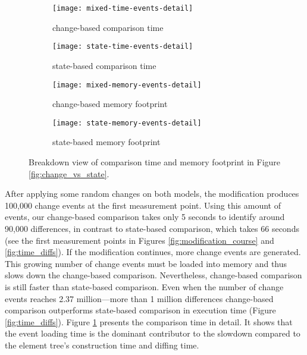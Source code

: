 \begin{figure}[ht]
  \centering
  \begin{subfigure}[t]{0.495\linewidth}
    \texttt{[image: mixed-time-events-detail]}
    \caption{change-based comparison time}
    \label{fig:time_changediff_detail}
  \end{subfigure}
  \hfill
  \begin{subfigure}[t]{0.495\linewidth}
    \texttt{[image: state-time-events-detail]}
    \caption{state-based comparison time}
    \label{fig:time_statediff_detail}
  \end{subfigure}
  \begin{subfigure}[t]{0.495\linewidth}
    \texttt{[image: mixed-memory-events-detail]}
    \caption{change-based memory footprint}
    \label{fig:memory_changediff_detail}
  \end{subfigure}
  \hfill
  \begin{subfigure}[t]{0.495\linewidth}
    \texttt{[image: state-memory-events-detail]}
    \caption{state-based memory footprint}
    \label{fig:memory_statediff_detail}
  \end{subfigure}
  \caption{Breakdown view of comparison time and memory footprint in Figure \ref{fig:change_vs_state}.}
  \label{fig:time_memory_detail}
\end{figure}

After applying some random changes on both models, the modification produces 100,000 change events at the first measurement point. Using this amount of events, our change-based comparison takes only 5 seconds to identify around 90,000 differences, in contrast to state-based comparison, which takes 66 seconds (see the first measurement points in Figures \ref{fig:modification_course} and \ref{fig:time_diffs}). If the modification continues, more change events are generated. This growing number of change events must be loaded into memory and thus slows down the change-based comparison. Nevertheless, change-based comparison is still faster than state-based comparison. Even when the number of change events reaches 2.37 million—more than 1 million differences  change-based comparison outperforms state-based comparison in execution time (Figure \ref{fig:time_diffs}). Figure \ref{fig:time_changediff_detail} presents the comparison time in detail. It shows that the event loading time is the dominant contributor to the slowdown compared to the element tree’s construction time and diffing time.

